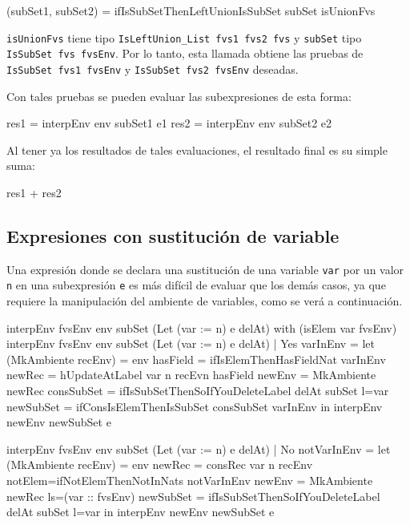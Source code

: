 \begin{code}
(subSet1, subSet2) =
  ifIsSubSetThenLeftUnionIsSubSet subSet isUnionFvs
\end{code}

\texttt{isUnionFvs} tiene tipo \texttt{IsLeftUnion\_List fvs1 fvs2 fvs} y \texttt{subSet} tipo \texttt{IsSubSet fvs fvsEnv}. Por lo tanto, esta llamada obtiene las pruebas de \texttt{IsSubSet fvs1 fvsEnv} y \texttt{IsSubSet fvs2 fvsEnv} deseadas.

Con tales pruebas se pueden evaluar las subexpresiones de esta forma:

\begin{code}
res1 = interpEnv env subSet1 e1
res2 = interpEnv env subSet2 e2
\end{code}

Al tener ya los resultados de tales evaluaciones, el resultado final es su simple suma:

\begin{code}
res1 + res2
\end{code}

\subsection{Expresiones con sustitución de variable}

Una expresión donde se declara una sustitución de una variable \texttt{var} por un valor \texttt{n} en una subexpresión \texttt{e} es más difícil de evaluar que los demás casos, ya que requiere la manipulación del ambiente de variables, como se verá a continuación.

\begin{code}
interpEnv {fvsEnv} env subSet (Let (var := n) e delAt)
    with (isElem var fvsEnv)
  interpEnv {fvsEnv} env subSet (Let (var := n) e delAt)
    | Yes varInEnv =
    let (MkAmbiente recEnv) = env
      hasField = ifIsElemThenHasFieldNat varInEnv 
      newRec = hUpdateAtLabel var n recEvn hasField
      newEnv = MkAmbiente newRec
      consSubSet =
        ifIsSubSetThenSoIfYouDeleteLabel delAt subSet {l=var}
      newSubSet = ifConsIsElemThenIsSubSet consSubSet varInEnv
    in interpEnv newEnv newSubSet e
 
  interpEnv {fvsEnv} env subSet (Let (var := n) e delAt)
    | No notVarInEnv =
    let (MkAmbiente recEnv) = env
      newRec = consRec var n recEnv
        {notElem=ifNotElemThenNotInNats notVarInEnv}
      newEnv = MkAmbiente newRec {ls=(var :: fvsEnv)}
      newSubSet =
        ifIsSubSetThenSoIfYouDeleteLabel delAt subSet {l=var}
    in interpEnv newEnv newSubSet e
\end{code}

